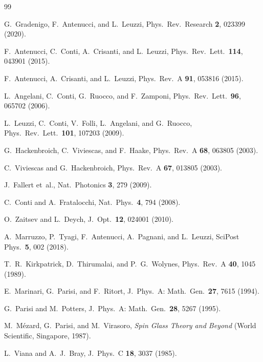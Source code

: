 \documentclass[11pt,a4paper]{article}
\begin{document}
\begin{thebibliography}{99}

  G.~Gradenigo, F.~Antenucci, and L.~Leuzzi,
  Phys.\ Rev.\ Research \textbf{2}, 023399 (2020).

  F.~Antenucci, C.~Conti, A.~Crisanti, and L.~Leuzzi,
  Phys.\ Rev.\ Lett.\ \textbf{114}, 043901 (2015).

  F.~Antenucci, A.~Crisanti, and L.~Leuzzi,
  Phys.\ Rev.\ A \textbf{91}, 053816 (2015).

  L.~Angelani, C.~Conti, G.~Ruocco, and F.~Zamponi,
  Phys.\ Rev.\ Lett.\ \textbf{96}, 065702 (2006).

  L.~Leuzzi, C.~Conti, V.~Folli, L.~Angelani, and G.~Ruocco,
  Phys.\ Rev.\ Lett.\ \textbf{101}, 107203 (2009).

  G.~Hackenbroich, C.~Viviescas, and F.~Haake,
  Phys.\ Rev.\ A \textbf{68}, 063805 (2003).

  C.~Viviescas and G.~Hackenbroich,
  Phys.\ Rev.\ A \textbf{67}, 013805 (2003).

  J.~Fallert et~al.,
  Nat.\ Photonics \textbf{3}, 279 (2009).

  C.~Conti and A.~Fratalocchi,
  Nat.\ Phys.\ \textbf{4}, 794 (2008).

  O.~Zaitsev and L.~Deych,
  J.~Opt.\ \textbf{12}, 024001 (2010).

  A.~Marruzzo, P.~Tyagi, F.~Antenucci, A.~Pagnani, and L.~Leuzzi,
  SciPost Phys.\ \textbf{5}, 002 (2018).

  T.~R.~Kirkpatrick, D.~Thirumalai, and P.~G.~Wolynes,
  Phys.\ Rev.\ A \textbf{40}, 1045 (1989).

  E.~Marinari, G.~Parisi, and F.~Ritort,
  J.~Phys.\ A: Math.\ Gen.\ \textbf{27}, 7615 (1994).

  G.~Parisi and M.~Potters,
  J.~Phys.\ A: Math.\ Gen.\ \textbf{28}, 5267 (1995).

  M.~M\'ezard, G.~Parisi, and M.~Virasoro,
  \textit{Spin Glass Theory and Beyond}
  (World Scientific, Singapore, 1987).

  L.~Viana and A.~J.~Bray,
  J.~Phys.\ C \textbf{18}, 3037 (1985).

\end{thebibliography}
\end{document}
